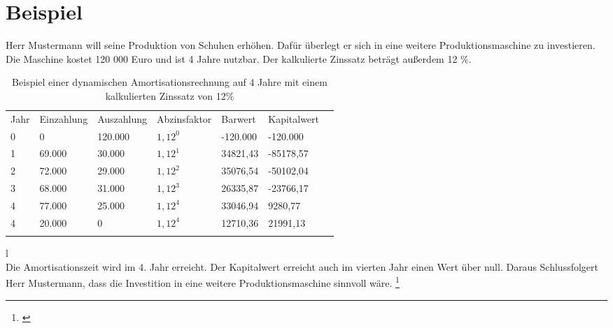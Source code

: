 \section{Beispiel}
Herr Mustermann will seine Produktion von Schuhen erhöhen. Dafür überlegt er sich in eine weitere Produktionsmaschine zu investieren. Die Maschine kostet 120 000 Euro und ist 4 Jahre nutzbar. Der kalkulierte Zinssatz beträgt außerdem 12 \%.

\begin{table}[!h]
    \caption{Beispiel einer dynamischen Amortisationsrechnung auf 4 Jahre mit einem kalkulierten Zinssatz von 12\%}
    \begin{tabular}{lllllll}
        \cline{1-6} \rowcolor{gray}
        Jahr & Einzahlung & Auszahlung & Abzinsfaktor & Barwert  & Kapitalwert \\ \cline{1-6} \rowcolor{white}
        0    & 0          & 120.000    & $1,12^0$     & -120.000 & -120.000    \\ \cline{1-6} \rowcolor{white}
        1    & 69.000     & 30.000     & $1,12^1$     & 34821,43 & -85178,57   \\ \cline{1-6} \rowcolor{white}
        2    & 72.000     & 29.000     & $1,12^2$     & 35076,54 & -50102,04   \\ \cline{1-6} \rowcolor{white}
        3    & 68.000     & 31.000     & $1,12^3$     & 26335,87 & -23766,17   \\ \cline{1-6} \rowcolor{white}
        4    & 77.000     & 25.000     & $1,12^4$     & 33046,94 & 9280,77     \\ \cline{1-6} \rowcolor{white}
        4    & 20.000     & 0          & $1,12^4$     & 12710,36 & 21991,13    \\ \cline{1-6} \rowcolor{white}
    \end{tabular}
    \label{tb:dynamische Amortisationsrechnung}
\end{table}
\phantom l \\
Die Amortisationszeit wird im 4. Jahr erreicht. Der Kapitalwert erreicht auch im vierten Jahr einen Wert über null. Daraus Schlussfolgert Herr Mustermann, dass die Investition in eine weitere Produktionsmaschine sinnvoll wäre.
\footnote{\cite{payoff}}

